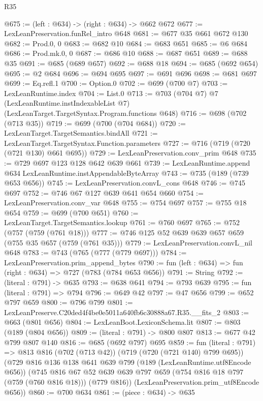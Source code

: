 \begin{lexlean}{R35}
\begin{coremodule}
@675 := (left : @634) -> (right : @634) -> @662 @672
@677 := LexLeanPreservation.funRel_intro @648
@681 := @677 @35 @661 @672 @130
@682 := Prod.{0, 0}
@683 := @682 @10
@684 := @683 @651
@685 := @6 @684
@686 := Prod.mk.{0, 0}
@687 := @686 @10
@688 := @687 @651
@689 := @688 @35
@691 := @685 (@689 @657)
@692 := @688 @18
@694 := @685 (@692 @654)
@695 := @2 @684
@696 := @694 @695
@697 := @691 @696
@698 := @681 @697
@699 := Eq.refl.{1}
@700 := Option.{0}
@702 := @699 (@700 @7)
@703 := LexLeanRuntime.index
@704 := List.{0}
@713 := @703
    (@704 @7)
    @7
    (LexLeanRuntime.instIndexableList @7)
    (LexLeanTarget.TargetSyntax.Program.functions @648)
@716 := @698 (@702 (@713 @35))
@719 := @699 (@700 (@704 @684))
@720 := LexLeanTarget.TargetSemantics.bindAll
@721 := LexLeanTarget.TargetSyntax.Function.parameters
@727 := @716 (@719 (@720 (@721 @130) @661 @695))
@729 := LexLeanPreservation.conv_prim @648
@735 := @729 @697 @123 @128 @642 @639 @661
@739 := LexLeanRuntime.append @634 LexLeanRuntime.instAppendableByteArray
@743 := @735 (@189 (@739 @653 @656))
@745 := LexLeanPreservation.convL_cons @648
@746 := @745 @697
@752 := @746 @67 @127 @639 @641 @654 @660
@754 := LexLeanPreservation.conv_var @648
@755 := @754 @697
@757 := @755 @18 @654
@759 := @699 (@700 @651)
@760 := LexLeanTarget.TargetSemantics.lookup
@761 := @760 @697
@765 := @752 (@757 (@759 (@761 @18)))
@777 := @746 @125 @52 @639 @639 @657 @659 (@755 @35 @657 (@759 (@761 @35)))
@779 := LexLeanPreservation.convL_nil @648
@783 := @743 (@765 (@777 (@779 @697)))
@784 := LexLeanPreservation.prim_append_bytes
@790 := fun (left : @634) => fun (right : @634) => @727 (@783 (@784 @653 @656))
@791 := String
@792 := (literal : @791) -> @635
@793 := @638 @641
@794 := @793 @639
@795 := fun (literal : @791) => @794
@796 := @649 @42
@797 := @47 @656
@799 := @652 @797 @659
@800 := @796 @799
@801 := LexLeanPreserve.C20ded4f4be0e5011a640fb6c30888a67.R35.__fits_2
@803 := @663 (@801 @656)
@804 := LexLeanBoot.LexiconSchema.lit
@807 := @803 (@189 (@804 @656))
@809 := (literal : @791) -> @800 @807
@813 := @677 @42 @799 @807 @140
@816 := @685 (@692 @797) @695
@859 := fun (literal : @791) =>
  @813
    @816
    (@702 (@713 @42))
    (@719 (@720 (@721 @140) @799 @695))
    (@729
      @816
      @136
      @138
      @641
      @639
      @799
      (@189 (LexLeanRuntime.utf8Encode @656))
      (@745
        @816
        @67
        @52
        @639
        @639
        @797
        @659
        (@754 @816 @18 @797 (@759 (@760 @816 @18)))
        (@779 @816))
      (LexLeanPreservation.prim_utf8Encode @656))
@860 := @700 @634
@861 := (piece : @634) -> @635

\end{coremodule}
\end{lexlean}
